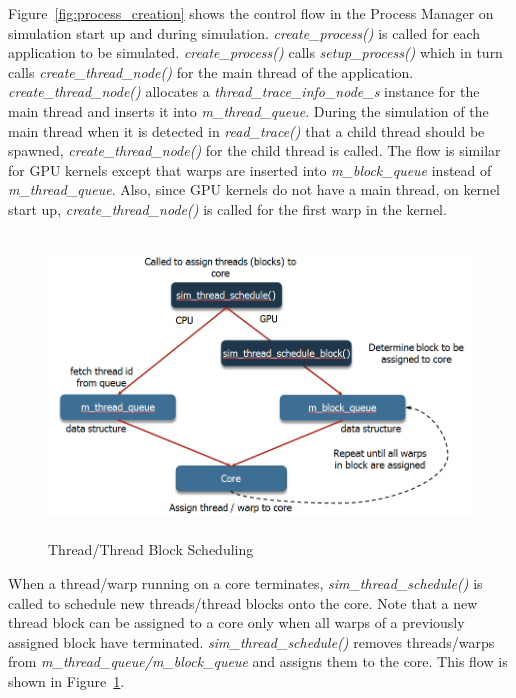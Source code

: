 Figure~\ref{fig:process_creation} shows the control flow in the Process Manager on
simulation start up and during simulation. \textit{create\_process()} is called
for each application to be simulated. \textit{create\_process()} calls
\textit{setup\_process()} which in turn calls \textit{create\_thread\_node()}
for the main thread of the application. \textit{create\_thread\_node()}
allocates a \textit{thread\_trace\_info\_node\_s} instance for the main thread
and inserts it into \textit{m\_thread\_queue}. During the simulation of the
main thread when it is detected in \textit{read\_trace()} that a child thread
should be spawned, \textit{create\_thread\_node()} for the child thread is
called. The flow is similar for GPU kernels except that warps are inserted into
\textit{m\_block\_queue} instead of \textit{m\_thread\_queue}. Also, since GPU
kernels do not have a main thread, on kernel start up,
\textit{create\_thread\_node()} is called for the first warp in the
kernel. 

\begin{figure}[htb]
\centering
\includegraphics[height=80mm]{figs/thread_scheduling}
\caption{Thread/Thread Block Scheduling}
\label{fig:thread_scheduling}
\end{figure}

When a thread/warp running on a core terminates,
     \textit{sim\_thread\_schedule()} is called to schedule new threads/thread
     blocks onto the core. Note that a new thread block can be assigned to a
     core only when all warps of a previously assigned block have terminated.
     \textit{sim\_thread\_schedule()} removes threads/warps from
     \textit{m\_thread\_queue/m\_block\_queue} and assigns them to the core.
     This flow is shown in Figure~\ref{fig:thread_scheduling}.

